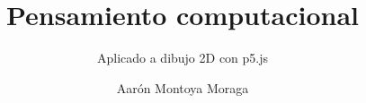 \documentclass[nocfonts]{nostarch}
\begin{document}
\frontmatter

\title{Pensamiento computacional}

\subtitle{Aplicado a dibujo 2D con p5.js}

\author{Aarón Montoya Moraga}


\makehalftitle

\maketitle

\brieftableofcontents

\tableofcontents

\mainmatter

% 
















\backmatter


\end{document}

